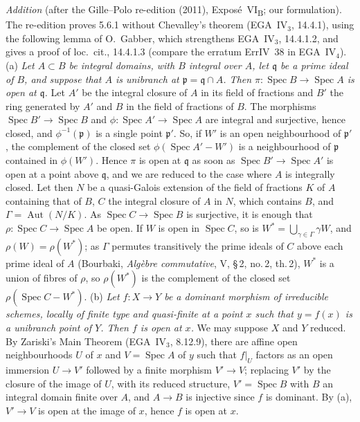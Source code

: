 \par\medskip\noindent
\emph{Addition} (after the Gille--Polo re-edition (2011), Expos\'e~VI\textsubscript{B}; our formulation).
The re-edition proves 5.6.1 without Chevalley's theorem (EGA~IV\(_3\), 14.4.1), using the following lemma of
O.~Gabber, which strengthens EGA~IV\(_3\), 14.4.1.2, and gives a proof of loc.\ cit., 14.4.1.3 (compare the
erratum ErrIV~38 in EGA~IV\(_4\)).
(a) \emph{Let \(A\subset B\) be integral domains, with \(B\) integral over \(A\), let \(\mathfrak q\) be a prime
ideal of \(B\), and suppose that \(A\) is unibranch at \(\mathfrak p=\mathfrak q\cap A\). Then
\(\pi\colon\operatorname{Spec}B\to\operatorname{Spec}A\) is open at \(\mathfrak q\).} Let \(A'\) be the
integral closure of \(A\) in its field of fractions and \(B'\) the ring generated by \(A'\) and \(B\) in the
field of fractions of \(B\). The morphisms \(\operatorname{Spec}B'\to\operatorname{Spec}B\) and
\(\phi\colon\operatorname{Spec}A'\to\operatorname{Spec}A\) are integral and surjective, hence closed, and
\(\phi^{-1}(\mathfrak p)\) is a single point \(\mathfrak p'\). So, if \(W'\) is an open neighbourhood of
\(\mathfrak p'\), the complement of the closed set \(\phi(\operatorname{Spec}A'-W')\) is a neighbourhood of
\(\mathfrak p\) contained in \(\phi(W')\). Hence \(\pi\) is open at \(\mathfrak q\) as soon as
\(\operatorname{Spec}B'\to\operatorname{Spec}A'\) is open at a point above \(\mathfrak q\), and we are reduced to
the case where \(A\) is integrally closed. Let then \(N\) be a quasi-Galois extension of the
field of fractions \(K\) of \(A\) containing that of \(B\), \(C\) the integral closure of \(A\) in \(N\), which
contains \(B\), and \(\Gamma=\operatorname{Aut}(N/K)\). As \(\operatorname{Spec}C\to\operatorname{Spec}B\) is
surjective, it is enough that \(\rho\colon\operatorname{Spec}C\to\operatorname{Spec}A\) be open. If \(W\) is
open in \(\operatorname{Spec}C\), so is \(W^*=\bigcup_{\gamma\in\Gamma}\gamma W\), and \(\rho(W)=\rho(W^*)\);
as \(\Gamma\) permutes transitively the prime ideals of \(C\) above each prime ideal of \(A\) (Bourbaki,
\emph{Alg\`ebre commutative}, V, \S\,2, no.\,2, th.\,2), \(W^*\) is a union of fibres of \(\rho\), so
\(\rho(W^*)\) is the complement of the closed set \(\rho(\operatorname{Spec}C-W^*)\).
(b) \emph{Let \(f\colon X\to Y\) be a dominant morphism of irreducible schemes, locally of finite type and
quasi-finite at a point \(x\) such that \(y=f(x)\) is a unibranch point of \(Y\). Then \(f\) is open at
\(x\).} We may suppose \(X\) and \(Y\) reduced. By Zariski's Main Theorem (EGA~IV\(_3\), 8.12.9), there are
affine open neighbourhoods \(U\) of \(x\) and \(V=\operatorname{Spec}A\) of \(y\) such that \(f|_U\) factors as
an open immersion \(U\to V'\) followed by a finite morphism \(V'\to V\); replacing \(V'\) by the closure of the
image of \(U\), with its reduced structure, \(V'=\operatorname{Spec}B\) with \(B\) an integral domain finite over
\(A\), and \(A\to B\) is injective since \(f\) is dominant. By (a), \(V'\to V\) is open at the image of \(x\),
hence \(f\) is open at \(x\).

